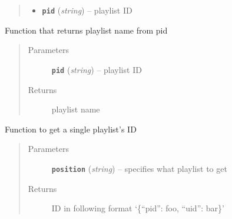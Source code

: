 \documentclass[letterpaper,10pt,english]{sphinxmanual}
\begin{document}
\begin{fulllineitems}
\begin{fulllineitems}
\begin{quote}
\begin{description}
\begin{itemize}
\item {} 
\textbf{\texttt{pid}} (\emph{string}) -- playlist ID

\end{itemize}

\end{description}\end{quote}

\end{fulllineitems}


\begin{fulllineitems}
\label{index:gitsound.SpotifyUser.get_playlist_from_id}
Function that returns playlist name from pid
\begin{quote}\begin{description}
\item[{Parameters}] \leavevmode
\textbf{\texttt{pid}} (\emph{string}) -- playlist ID

\item[{Returns}] \leavevmode
playlist name

\end{description}\end{quote}

\end{fulllineitems}


\begin{fulllineitems}
\label{index:gitsound.SpotifyUser.get_playlist_id}
Function to get a single playlist's ID
\begin{quote}\begin{description}
\item[{Parameters}] \leavevmode
\textbf{\texttt{position}} (\emph{string}) -- specifies what playlist to get

\item[{Returns}] \leavevmode
ID in following format `\{``pid'': foo, ``uid'': bar\}'

\end{description}\end{quote}

\end{fulllineitems}



\end{fulllineitems}
\end{document}
